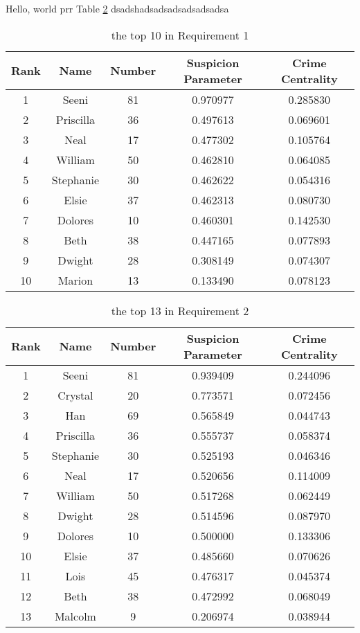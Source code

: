 \documentclass[12pt]{article}
\begin{document}
Hello, world  
prr Table \ref{1_8_7}
dsadshadsadsadsadsadsadsa  




\begin{table}[!htf]
\centering
\begin{tabular}{c|c|c|c|c}
\hline
\hline
Rank & Name & Number & Suspicion Parameter & Crime Centrality \\
\hline
1 & Seeni & 81 & 0.970977 & 0.285830 \\
2 & Priscilla & 36 & 0.497613 & 0.069601 \\
3 & Neal & 17 & 0.477302 & 0.105764 \\
4 & William & 50 & 0.462810 & 0.064085 \\
5 & Stephanie & 30 & 0.462622 & 0.054316 \\
6 & Elsie & 37 & 0.462313 & 0.080730 \\
7 & Dolores & 10 & 0.460301 & 0.142530 \\
8 & Beth & 38 & 0.447165 & 0.077893 \\
9 & Dwight & 28 & 0.308149 & 0.074307 \\
10 & Marion & 13 & 0.133490 & 0.078123 \\
\hline
\end{tabular}
\caption{the top 10 in Requirement 1}
\label{1_7_8}
\end{table}

\begin{table}[!htf]
\centering
\begin{tabular}{c|c|c|c|c}
\hline
Rank & Name & Number & Suspicion Parameter & Crime Centrality \\
\hline
1 & Seeni & 81 & 0.939409 & 0.244096 \\
2 & Crystal & 20 & 0.773571 & 0.072456 \\
3 & Han & 69 & 0.565849 & 0.044743 \\
4 & Priscilla & 36 & 0.555737 & 0.058374 \\
5 & Stephanie & 30 & 0.525193 & 0.046346 \\
6 & Neal & 17 & 0.520656 & 0.114009 \\
7 & William & 50 & 0.517268 & 0.062449 \\
8 & Dwight & 28 & 0.514596 & 0.087970 \\
9 & Dolores & 10 & 0.500000 & 0.133306 \\
10 & Elsie & 37 & 0.485660 & 0.070626 \\
11 & Lois & 45 & 0.476317 & 0.045374 \\
12 & Beth & 38 & 0.472992 & 0.068049 \\
13 & Malcolm & 9 & 0.206974 & 0.038944 \\
\hline
\end{tabular}
\caption{the top 13 in Requirement 2}
\label{1_8_7}
\end{table}
\end{document}
